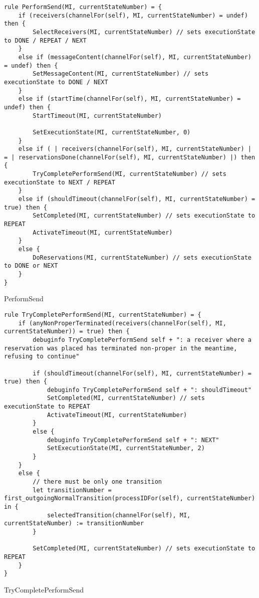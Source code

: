 \begin{listing}[H]
\begin{verbatim}
rule PerformSend(MI, currentStateNumber) = {
    if (receivers(channelFor(self), MI, currentStateNumber) = undef) then {
        SelectReceivers(MI, currentStateNumber) // sets executionState to DONE / REPEAT / NEXT
    }
    else if (messageContent(channelFor(self), MI, currentStateNumber) = undef) then {
        SetMessageContent(MI, currentStateNumber) // sets executionState to DONE / NEXT
    }
    else if (startTime(channelFor(self), MI, currentStateNumber) = undef) then {
        StartTimeout(MI, currentStateNumber)

        SetExecutionState(MI, currentStateNumber, 0)
    }
    else if ( | receivers(channelFor(self), MI, currentStateNumber) | = | reservationsDone(channelFor(self), MI, currentStateNumber) |) then {
        TryCompletePerformSend(MI, currentStateNumber) // sets executionState to NEXT / REPEAT
    }
    else if (shouldTimeout(channelFor(self), MI, currentStateNumber) = true) then {
        SetCompleted(MI, currentStateNumber) // sets executionState to REPEAT
        ActivateTimeout(MI, currentStateNumber)
    }
    else {
        DoReservations(MI, currentStateNumber) // sets executionState to DONE or NEXT
    }
}
\end{verbatim}
\caption{PerformSend}
\label{lst:asm:PerformSend}
\end{listing}




\begin{listing}[H]
\begin{verbatim}
rule TryCompletePerformSend(MI, currentStateNumber) = {
    if (anyNonProperTerminated(receivers(channelFor(self), MI, currentStateNumber)) = true) then {
        debuginfo TryCompletePerformSend self + ": a receiver where a reservation was placed has terminated non-proper in the meantime, refusing to continue"

        if (shouldTimeout(channelFor(self), MI, currentStateNumber) = true) then {
            debuginfo TryCompletePerformSend self + ": shouldTimeout"
            SetCompleted(MI, currentStateNumber) // sets executionState to REPEAT
            ActivateTimeout(MI, currentStateNumber)
        }
        else {
            debuginfo TryCompletePerformSend self + ": NEXT"
            SetExecutionState(MI, currentStateNumber, 2)
        }
    }
    else {
        // there must be only one transition
        let transitionNumber = first_outgoingNormalTransition(processIDFor(self), currentStateNumber) in {
            selectedTransition(channelFor(self), MI, currentStateNumber) := transitionNumber
        }

        SetCompleted(MI, currentStateNumber) // sets executionState to REPEAT
    }
}
\end{verbatim}
\caption{TryCompletePerformSend}
\label{lst:asm:TryCompletePerformSend}
\end{listing}




